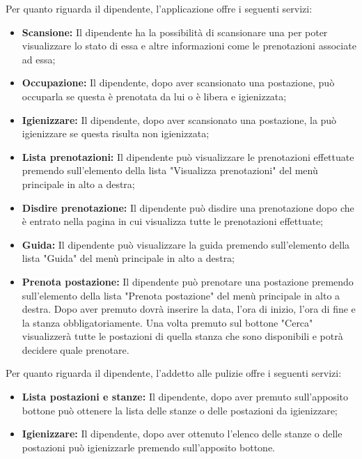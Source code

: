 Per quanto riguarda il dipendente, l'applicazione offre i seguenti servizi:
\begin{itemize}
	\item \textbf{Scansione:} Il dipendente ha la possibilità di scansionare una  per poter visualizzare lo stato di essa e altre informazioni come le prenotazioni associate ad essa; \\
	\item \textbf{Occupazione:} Il dipendente, dopo aver scansionato una postazione, può occuparla se questa è prenotata da lui o è libera e igienizzata; \\
	\item \textbf{Igienizzare:} Il dipendente, dopo aver scansionato una postazione, la può igienizzare se questa risulta non igienizzata; \\
	\item \textbf{Lista prenotazioni:} Il dipendente può visualizzare le prenotazioni effettuate premendo sull'elemento della lista "Visualizza prenotazioni" del menù principale in alto a destra; \\
	\item \textbf{Disdire prenotazione:} Il dipendente può disdire una prenotazione dopo che è entrato nella pagina in cui visualizza tutte le prenotazioni effettuate; \\
	\item \textbf{Guida:} Il dipendente può visualizzare la guida premendo sull'elemento della lista "Guida" del menù principale in alto a destra; \\
	\item \textbf{Prenota postazione:} Il dipendente può prenotare una postazione premendo sull'elemento della lista "Prenota postazione" del menù principale in alto a destra.
	Dopo aver premuto dovrà inserire la data, l'ora di inizio, l'ora di fine e la stanza obbligatoriamente.
	Una volta premuto sul bottone "Cerca" visualizzerà tutte le postazioni di quella stanza che sono disponibili e potrà decidere quale prenotare. \\	
\end{itemize}
Per quanto riguarda il dipendente, l'addetto alle pulizie offre i seguenti servizi:
\begin{itemize}
\item \textbf{Lista postazioni e stanze:} Il dipendente, dopo aver premuto sull'apposito bottone può ottenere la lista delle stanze o delle postazioni da igienizzare; \\
\item \textbf{Igienizzare:} Il dipendente, dopo aver ottenuto l'elenco delle stanze o delle postazioni può igienizzarle premendo sull'apposito bottone.\\
\end{itemize}





